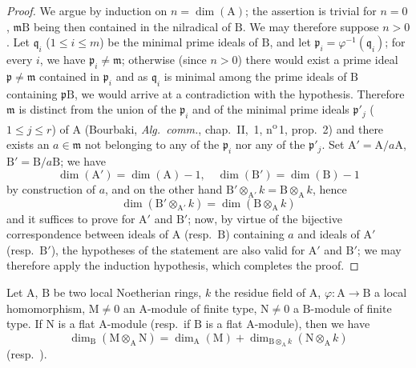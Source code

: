 \begin{proof}
We argue by induction on $n=\dim(\mathrm{A})$; the assertion is trivial for $n=0$, $\mathfrak{m}\mathrm{B}$ being then contained in the nilradical of $\mathrm{B}$.
We may therefore suppose $n>0$.
Let $\mathfrak{q}_i$ ($1\leqslant i\leqslant m$) be the minimal prime ideals of $\mathrm{B}$, and let $\mathfrak{p}_i=\varphi^{-1}(\mathfrak{q}_i)$; for every $i$, we have $\mathfrak{p}_i\neq\mathfrak{m}$; otherwise (since $n>0$) there would exist a prime ideal $\mathfrak{p}\neq\mathfrak{m}$ contained in $\mathfrak{p}_i$ and as $\mathfrak{q}_i$ is minimal among the prime ideals of $\mathrm{B}$ containing $\mathfrak{p}\mathrm{B}$, we would arrive at a contradiction with the hypothesis.
Therefore $\mathfrak{m}$ is distinct from the union of the $\mathfrak{p}_i$ and of the minimal prime ideals $\mathfrak{p}'_j$ ($1\leqslant j\leqslant r$) of $\mathrm{A}$ (Bourbaki, \emph{Alg.\ comm.}, chap.~II, \textsection\,1, n\textsuperscript{o}\,1, prop.~2) and there exists an $a\in\mathfrak{m}$ not belonging to any of the $\mathfrak{p}_i$ nor any of the $\mathfrak{p}'_j$.
Set $\mathrm{A}'=\mathrm{A}/a\mathrm{A}$, $\mathrm{B}'=\mathrm{B}/a\mathrm{B}$; we have 
\[
  \dim(\mathrm{A}')=\dim(\mathrm{A})-1,\quad
  \dim(\mathrm{B}')=\dim(\mathrm{B})-1
\]
by construction of $a$, and on the other hand $\mathrm{B}'\otimes_{\mathrm{A}'}k=\mathrm{B}\otimes_\mathrm{A} k$, hence
\[
  \dim(\mathrm{B}'\otimes_{\mathrm{A}'}k)=\dim(\mathrm{B}\otimes_\mathrm{A} k)
\]
and it suffices to prove  for $\mathrm{A}'$ and $\mathrm{B}'$; now, by virtue of the bijective correspondence between ideals of $\mathrm{A}$ (resp.\ $\mathrm{B}$) containing $a$ and ideals of $\mathrm{A}'$ (resp.\ $\mathrm{B}'$), the hypotheses of the statement are also valid for $\mathrm{A}'$ and $\mathrm{B}'$; we may therefore apply the induction hypothesis, which completes the proof.
\end{proof}

\begin{corollary}[6.1.2]
\label{IV.6.1.2}
Let $\mathrm{A}$, $\mathrm{B}$ be two local Noetherian rings, $k$ the residue field of $\mathrm{A}$, $\varphi:\mathrm{A}\to\mathrm{B}$ a local homomorphism, $\mathrm{M}\neq 0$ an $\mathrm{A}$-module of finite type, $\mathrm{N}\neq 0$ a $\mathrm{B}$-module of finite type.
If $\mathrm{N}$ is a flat $\mathrm{A}$-module \textnormal{(}resp.\ if $\mathrm{B}$ is a flat $\mathrm{A}$-module\textnormal{)}, then we have
\begin{equation}
  \dim_\mathrm{B}(\mathrm{M}\otimes_\mathrm{A}\mathrm{N})=\dim_\mathrm{A}(\mathrm{M})+\dim_{\mathrm{B}\otimes_\mathrm{A} k}(\mathrm{N}\otimes_\mathrm{A} k)
  \label{IV.6.1.2.1}
\tag{6.1.2.1}
\end{equation}
\textnormal{(}resp.\ \textnormal{)}.
\end{corollary}

